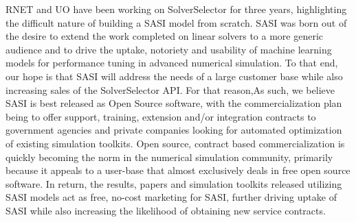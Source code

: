 RNET and UO have been working on SolverSelector for three years, highlighting the difficult nature of building a SASI model from scratch. SASI was born out of the desire to extend the work completed on linear solvers to a more generic audience and to drive the uptake, notoriety and usability of machine learning models for performance tuning in advanced numerical simulation. To that end, our hope is that SASI will address the needs of a large customer base while also increasing sales of the SolverSelector API. For that reason,As such, we believe SASI is best released as Open Source software, with the commercialization plan being to offer support, training, extension and/or integration contracts to government agencies and private companies looking for automated optimization of existing simulation toolkits.  Open source, contract based commercialization is quickly becoming the norm in the numerical simulation community, primarily because it appeals to a user-base that almost exclusively deals in free open source software. In return, the results, papers and simulation toolkits released utilizing SASI models act as free, no-cost marketing for SASI, further driving uptake of SASI while also increasing the likelihood of obtaining new service contracts. 

